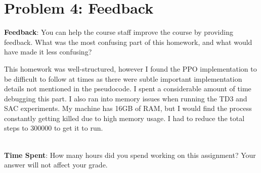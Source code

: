 \documentclass[12pt]{article}
\begin{document}



\newpage

\section*{Problem 4: Feedback}

\textbf{Feedback}: You can help the course staff improve the course by providing feedback. What was the most confusing part of this homework, and what would have made it less confusing?

\begin{tcolorbox}[fit,height=12em, width=40em, blank, borderline={1pt}{1pt},nobeforeafter]
            \begin{center}
            This homework was well-structured, however I found the PPO implementation to be difficult to follow at times as there were 
            subtle important implementation details not mentioned in the pseudocode. I spent a considerable amount of time debugging this part.
            I also ran into memory issues when running the TD3 and SAC experiments. My machine has 16GB of RAM, but I would find 
            the process constantly getting killed due to high memory usage. I had to reduce the total steps to 300000 to get it to run.
            \end{center}
            \end{tcolorbox}\\

\noindent\textbf{Time Spent}: How many hours did you spend working on this assignment? Your answer will not affect your grade.
\end{document}
